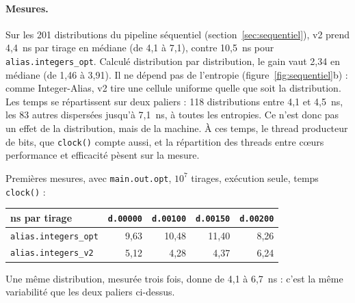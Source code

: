 \documentclass[11pt,a4paper]{article}
\newcommand{\code}[1]{\texttt{#1}}
\begin{document}
\paragraph{Mesures.} Sur les 201 distributions du pipeline séquentiel
(section~\ref{sec:sequentiel}), v2 prend 4,4~ns par tirage en médiane (de 4,1 à 7,1),
contre 10,5~ns pour \code{alias.integers\_opt}. Calculé distribution par distribution,
le gain vaut 2,34 en médiane (de 1,46 à 3,91). Il ne dépend pas de l'entropie
(figure~\ref{fig:sequentiel}b) : comme Integer-Alias, v2 tire une cellule uniforme
quelle que soit la distribution. Les temps se répartissent sur deux paliers : 118
distributions entre 4,1 et 4,5~ns, les 83 autres dispersées jusqu'à 7,1~ns, à toutes
les entropies. Ce n'est donc pas un effet de la distribution, mais de la machine. À ces
temps, le thread producteur de bits, que \code{clock()} compte aussi, et la répartition
des threads entre cœurs performance et efficacité pèsent sur la mesure.

\noindent Premières mesures, avec \code{main.out.opt}, $10^7$ tirages, exécution
seule, temps \code{clock()} :
\begin{table}[H]
\centering
\small
\begin{tabular}{lrrrr}
\toprule
ns par tirage & \code{d.00000} & \code{d.00100} & \code{d.00150} & \code{d.00200} \\
\midrule
\code{alias.integers\_opt} & 9,63 & 10,48 & 11,40 & 8,26 \\
\code{alias.integers\_v2}  & 5,12 & 4,28 & 4,37 & 6,24 \\
\bottomrule
\end{tabular}
\end{table}
\noindent Une même distribution, mesurée trois fois, donne de 4,1 à 6,7~ns : c'est la
même variabilité que les deux paliers ci-dessus.
\end{document}
